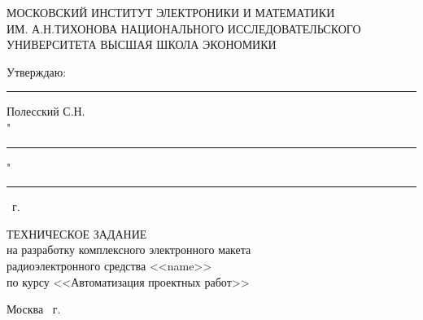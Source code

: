 \begin{titlepage}
	\begin{center}
		МОСКОВСКИЙ ИНСТИТУТ ЭЛЕКТРОНИКИ И МАТЕМАТИКИ\\
		ИМ. А.Н.ТИХОНОВА НАЦИОНАЛЬНОГО ИССЛЕДОВАТЕЛЬСКОГО\\
		УНИВЕРСИТЕТА ВЫСШАЯ ШКОЛА ЭКОНОМИКИ
	\end{center}
	
	
	\vspace{8ex}
	
	\begin{flushright}
		Утверждаю:\\
		\rule{2.5cm}{0.4pt} Полесский С.Н.\\
		"\rule{1.2cm}{0.4pt}"\rule{2.9cm}{0.4pt} \the\year \, г.
		
		
	\end{flushright}	
	
	\vspace{5ex}
	
	\begin{center}
		ТЕХНИЧЕСКОЕ ЗАДАНИЕ\\
		на разработку комплексного электронного макета\\
		радиоэлектронного средства <<name>>\\
		по курсу <<Автоматизация проектных работ>>

	\end{center}	

	\vspace{2ex}
	\vfill
	
	\vspace{2ex}
	
	

	\vspace{5ex}
	\begin{center}
		Москва \the\year \, г.
	\end{center}
	
\end{titlepage}
\addtocounter{page}{1}